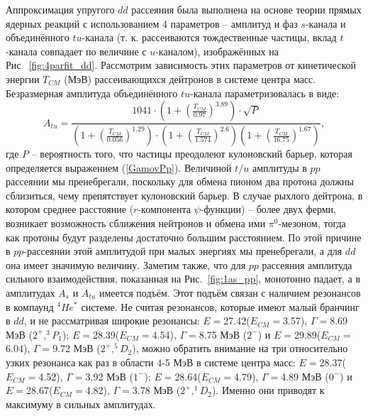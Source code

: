\documentclass[a4paper,12pt]{article}
\begin{document}
\begin{large}
  Аппроксимация упругого $dd$ рассеяния была выполнена на основе теории прямых ядерных реакций с использованием 4 параметров -- амплитуд и фаз $s$-канала и объединённого $tu$-канала (т. к. рассеиваются тождественные частицы, вклад $t$-канала совпадает по величине с $u$-каналом), изображённых на Рис.~\ref{fig:4parfit_dd}.
  Рассмотрим зависимость этих параметров от кинетической энергии $T_{CM}$ (МэВ) рассеивающихся дейтронов в системе центра масс.
  Безразмерная амплитуда объединённого $tu$-канала параметризовалась в виде:
\begin{equation}
  \label{AmplitudeTU}
A_{tu} = \frac{1041\cdot \left( 1 + \left(\frac{T_{CM}}{0.97} \right)^{3.89} \right) \cdot \sqrt{P}}{ \left( 1 + \left(\frac{T_{CM}}{0.056} \right)^{1.29} \right) \cdot \left( 1 + \left(\frac{T_{CM}}{1.574} \right)^{2.6} \right)\left( 1+\left(\frac{T_{CM}}{16.75}\right)^{1.67}\right) },
\end{equation}
где $P$ -- вероятность того, что частицы преодолеют кулоновский барьер, которая определяется выражением (\ref{GamovPp}).
  Величиной $t/u$ амплитуды в $pp$ рассеянии мы пренебрегали, поскольку для обмена пионом два протона должны сблизиться, чему препятствует кулоновский барьер.
  В случае рыхлого дейтрона, в котором среднее расстояние ($r$-компонента $\psi$-функции) -- более двух ферми, возникает возможность сближения нейтронов и обмена ими $\pi^0$-мезоном, тогда как протоны будут разделены достаточно большим расстоянием.
  По этой причине в $pp$-рассеянии этой амплитудой при малых энергиях мы пренебрегали, а для $dd$ она имеет значимую величину.
  Заметим также, что для $pp$ рассеяния амплитуда сильного взаимодействия, показанная на Рис.~\ref{fig:1as_pp}, монотонно падает, а в амплитудах $A_s$ и $A_{tu}$ имеется подъём.
  Этот подъём связан с наличием резонансов в компаунд $^4He^*$ системе.
  Не считая резонансов, которые имеют малый бранчинг в $dd$, и не рассматривая широкие резонансы: $E=$27.42($E_{CM}=$3.57), $\Gamma=$8.69 МэВ ($2^+, ^3P_1$); $E=$28.39($E_{CM}=$4.54), $\Gamma=$8.75 МэВ ($2^-$) и $E=$29.89($E_{CM}=$6.04), $\Gamma=$9.72 МэВ ($2^+, ^5D_2$), можно обратить внимание на три относительно узких резонанса как раз в области 4-5 МэВ в системе центра масс: $E=$28.37($E_{CM}=$4.52), $\Gamma=$3.92 МэВ ($1^-$); $E=$28.64($E_{CM}=$4.79), $\Gamma=$4.89 МэВ ($0^-$) и $E=$28.67($E_{CM}=$4.82), $\Gamma=$3.78 МэВ ($2^+, ^1D_2$).
  Именно они приводят к максимуму в сильных амплитудах.


\end{large}
\end{document}
